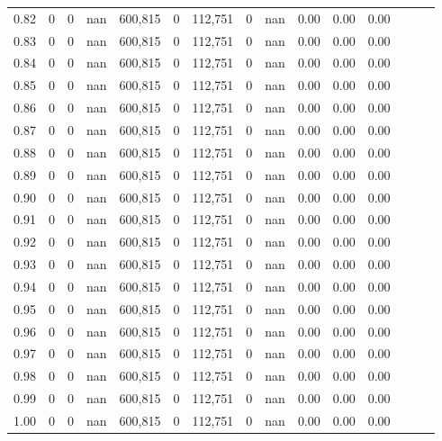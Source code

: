 \begin{tabular}{rrrrrrrrrrrrrrr}
0.82 &        0 &       0 &   nan &  600,815 &        0 &  112,751 &        0 &   nan &  0.00 &  0.00 &      0.00 \\
0.83 &        0 &       0 &   nan &  600,815 &        0 &  112,751 &        0 &   nan &  0.00 &  0.00 &      0.00 \\
0.84 &        0 &       0 &   nan &  600,815 &        0 &  112,751 &        0 &   nan &  0.00 &  0.00 &      0.00 \\
0.85 &        0 &       0 &   nan &  600,815 &        0 &  112,751 &        0 &   nan &  0.00 &  0.00 &      0.00 \\
0.86 &        0 &       0 &   nan &  600,815 &        0 &  112,751 &        0 &   nan &  0.00 &  0.00 &      0.00 \\
0.87 &        0 &       0 &   nan &  600,815 &        0 &  112,751 &        0 &   nan &  0.00 &  0.00 &      0.00 \\
0.88 &        0 &       0 &   nan &  600,815 &        0 &  112,751 &        0 &   nan &  0.00 &  0.00 &      0.00 \\
0.89 &        0 &       0 &   nan &  600,815 &        0 &  112,751 &        0 &   nan &  0.00 &  0.00 &      0.00 \\
0.90 &        0 &       0 &   nan &  600,815 &        0 &  112,751 &        0 &   nan &  0.00 &  0.00 &      0.00 \\
0.91 &        0 &       0 &   nan &  600,815 &        0 &  112,751 &        0 &   nan &  0.00 &  0.00 &      0.00 \\
0.92 &        0 &       0 &   nan &  600,815 &        0 &  112,751 &        0 &   nan &  0.00 &  0.00 &      0.00 \\
0.93 &        0 &       0 &   nan &  600,815 &        0 &  112,751 &        0 &   nan &  0.00 &  0.00 &      0.00 \\
0.94 &        0 &       0 &   nan &  600,815 &        0 &  112,751 &        0 &   nan &  0.00 &  0.00 &      0.00 \\
0.95 &        0 &       0 &   nan &  600,815 &        0 &  112,751 &        0 &   nan &  0.00 &  0.00 &      0.00 \\
0.96 &        0 &       0 &   nan &  600,815 &        0 &  112,751 &        0 &   nan &  0.00 &  0.00 &      0.00 \\
0.97 &        0 &       0 &   nan &  600,815 &        0 &  112,751 &        0 &   nan &  0.00 &  0.00 &      0.00 \\
0.98 &        0 &       0 &   nan &  600,815 &        0 &  112,751 &        0 &   nan &  0.00 &  0.00 &      0.00 \\
0.99 &        0 &       0 &   nan &  600,815 &        0 &  112,751 &        0 &   nan &  0.00 &  0.00 &      0.00 \\
1.00 &        0 &       0 &   nan &  600,815 &        0 &  112,751 &        0 &   nan &  0.00 &  0.00 &      0.00 \\
\bottomrule
\end{tabular}
